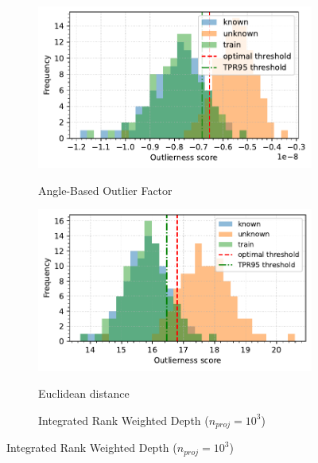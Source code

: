 \begin{figure}[t]
    \centering
    \begin{subfigure}[b]{0.495\textwidth}
        \centering
        \caption{\small Angle-Based Outlier Factor}
        \includegraphics[width=\textwidth]{images/distributions/histograms/hist-distributions-dimension_250-samples_1000-distance_8-distribution_gaussian-model_ABOF-seed_0.pdf}
        \label{fig:histogram-abof}
    \end{subfigure}
    \hfill
    \begin{subfigure}[b]{0.495\textwidth}
        \centering
        \caption{\small Euclidean distance}
        \includegraphics[width=\textwidth]{images/distributions/histograms/hist-distributions-dimension_250-samples_1000-distance_8-distribution_gaussian-model_ED-seed_0.pdf}
        \label{fig:histogram-euclidean}
    \end{subfigure}
    \begin{subfigure}[b]{0.495\textwidth}
        \centering
        \caption{\footnotesize Integrated Rank Weighted Depth ({\scriptsize$n_{proj} = 10^3$})}

\end{subfigure}
\end{figure}
